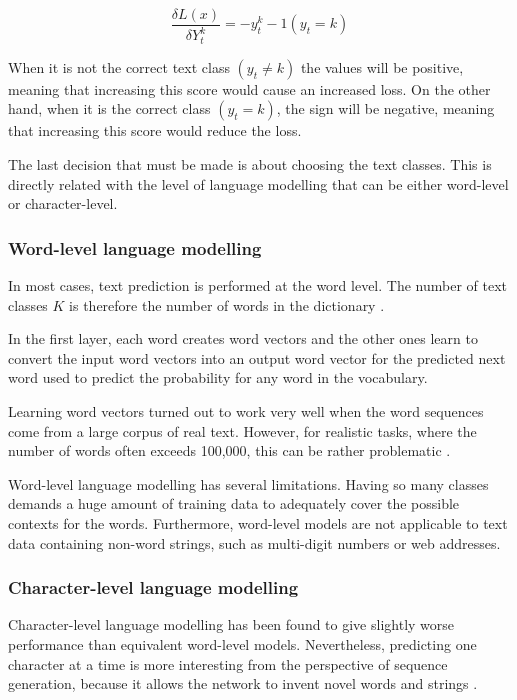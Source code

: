 \begin{equation} \label{eq:cgradient}
\frac{\delta L(x)}{\delta Y^k_t}=- y^k_t - 1 (y_t=k)
\end{equation}

When it is not the correct text class $(y_t \not= k)$ the values will be positive, meaning that increasing this score would cause an increased loss. On the other hand, when it is the correct class $(y_t = k)$, the sign will be negative, meaning that increasing this score would reduce the loss.


The last decision that must be made is about choosing the text classes. This is directly related with the level of language modelling that can be either word-level or character-level.

\subsubsection{Word-level language modelling}

In most cases, text prediction is performed at the word level. The number of text classes $K$ is therefore the number of words in the dictionary \cite{graves2013generating}.

In the first layer, each word creates word vectors and the other ones learn to convert the input word vectors into an output word vector for the predicted next word used to predict the probability for any word in the vocabulary. 

Learning word vectors turned out to work very well when the word sequences come from a large corpus of real text. However, for realistic tasks, where the number of words often exceeds 100,000, this can be rather problematic \cite{lecun2015deep}. 

Word-level language modelling has several limitations. Having so many classes demands a huge amount of training data to adequately cover the possible contexts for the words. Furthermore, word-level models are not applicable to text data containing non-word strings, such as multi-digit numbers or web addresses.\cite{graves2013generating}

\subsubsection{Character-level language modelling}


Character-level language modelling has been found to give slightly worse performance than equivalent word-level models. Nevertheless, predicting one character at a time is more interesting from the perspective of sequence generation, because it allows the network to invent novel words and strings \cite{graves2013generating}. 

